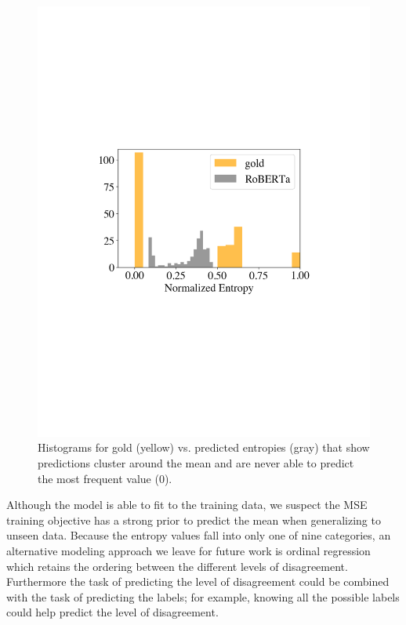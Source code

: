 \begin{figure}[t]
 \centering
 \vspace{-1.2em}
  \centering
  \includegraphics[scale=0.3]{plots/subj_entropy_gold_preds.pdf}
  \vspace{-.3em}
  \caption{Histograms for gold (yellow) vs. predicted entropies (gray) that show predictions cluster around the mean and are never able to predict the most frequent value (0).}
  \label{fig:subj_entropies}
  \vspace{-.3em}
\end{figure}

Although the model is able to fit to the training data, we suspect the MSE training objective has a strong prior to predict the mean when generalizing to unseen data. Because the entropy values fall into only one of nine categories, an alternative modeling approach we leave for future work is ordinal regression which retains the ordering between the different levels of disagreement. Furthermore the task of predicting the level of disagreement could be combined with the task of predicting the labels; for example, knowing all the possible labels could help predict the level of disagreement.


